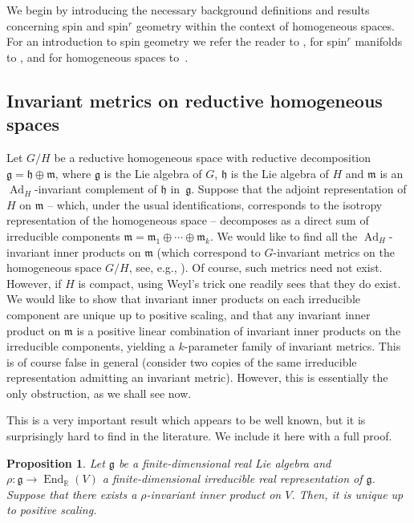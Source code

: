 \documentclass[pdftex]{sigma}
\numberwithin{equation}{section}
\newtheorem{Proposition}[Theorem]{Proposition}
{ \theoremstyle{definition}
	\newtheorem{Definition}[Theorem]{Definition}
	\newtheorem{Note}[Theorem]{Note}
	\newtheorem{Example}[Theorem]{Example}
	\newtheorem{Remark}[Theorem]{Remark} }
\DeclareMathOperator{\End}{End}
\DeclareMathOperator{\Ad}{Ad}
\begin{document}
		We begin by introducing the necessary background definitions and results concerning spin and spin$^r$ geometry within the context of homogeneous spaces. For an introduction to spin geometry we refer the reader to \cite{BFGK,LM}, for spin$^r$ manifolds to \cite{AM21,gen_spin_AL,EH16}, and for homogeneous spaces to~\cite{Arv03}.
		
		\subsection{Invariant metrics on reductive homogeneous spaces}\label{sec:inv_metrics}
		
		Let $G/H$ be a reductive homogeneous space with reductive decomposition $\mathfrak{g} = \mathfrak{h} \oplus \mathfrak{m}$, where $\mathfrak{g}$ is the Lie algebra of $G$, $\mathfrak{h}$ is the Lie algebra of $H$ and $\mathfrak{m}$ is an $\Ad_H$-invariant complement of $\mathfrak{h}$ in~$\mathfrak{g}$. Suppose that the adjoint representation of $H$ on $\mathfrak{m}$ -- which, under the usual identifications, corresponds to the isotropy representation of the homogeneous space -- decomposes as a direct sum of irreducible components $\mathfrak{m} = \mathfrak{m}_1 \oplus \cdots \oplus \mathfrak{m}_k$. We would like to find all the $\Ad_H$-invariant inner products on $\mathfrak{m}$ (which correspond to $G$-invariant metrics on the homogeneous space $G/H$, see, e.g., \cite{Arv03}). Of course, such metrics need not exist. However, if $H$ is compact, using Weyl's trick one readily sees that they do exist. We would like to show that invariant inner products on each irreducible component are unique up to positive scaling, and that any invariant inner product on $\mathfrak{m}$ is a positive linear combination of invariant inner products on the irreducible components, yielding a $k$-parameter family of invariant metrics. This is of course false in general (consider two copies of the same irreducible representation admitting an invariant metric). However, this is essentially the only obstruction, as we shall see now.
		
		This is a very important result which appears to be well known, but it is surprisingly hard to find in the literature. We include it here with a full proof.
		
		\begin{Proposition}\label{prop:invmetrics1}
			Let $\mathfrak{g}$ be a finite-dimensional real Lie algebra and $\rho \colon \mathfrak{g} \to \End_{\mathbb{R}}(V)$ a finite-dimensional irreducible real representation of $\mathfrak{g}$. Suppose that there exists a $\rho$-invariant inner product on $V$. Then, it is unique up to positive scaling.
		\end{Proposition}
		
\end{document}
